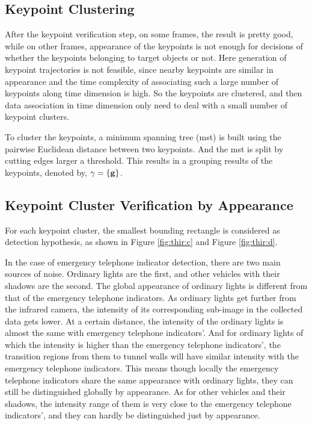 \subsection{Keypoint Clustering}
After the keypoint verification step, on some frames, the result is pretty good, while on other frames, appearance of the keypoints is not enough for decisions of whether the keypoints belonging to target objects or not. Here generation of keypoint trajectories is not feasible, since nearby keypoints are similar in appearance and  the time complexity of associating such a large number of keypoints along time dimension is high. So the keypoints are clustered, and then data association in time dimension only need to deal with a small number of keypoint clusters.

To cluster the keypoints, a minimum spanning tree (mst) is built using the pairwise Euclidean distance between two keypoints. And the mst is split by cutting edges larger a threshold. This results in a grouping results of the keypoints, denoted by, $\gamma=\{\bf{g}\}$.


\subsection{Keypoint Cluster Verification by Appearance}

For each keypoint cluster, the smallest bounding rectangle is considered as detection hypothesis, as shown in Figure \ref{fig:thir:c} and Figure \ref{fig:thir:d}.

In the case of emergency telephone indicator detection, there are two main sources of noise. Ordinary lights are the first, and other vehicles with their shadows are the second. The global appearance of ordinary lights is different from that of the emergency telephone indicators. As ordinary lights get further from the infrared camera, the intensity of its corresponding sub-image in the collected data gets lower. At a certain distance, the intensity of the ordinary  lights is almost the same with emergency telephone indicators'. And for ordinary lights of which the intensity is higher than the emergency telephone indicators', the transition regions from them to tunnel walls will have similar intensity with the emergency telephone indicators.
This means though locally the emergency telephone indicators share the same appearance with ordinary lights, they can still be distinguished globally by appearance. As for other vehicles and their shadows, the intensity range of them is very close to the emergency telephone indicators', and they can hardly be distinguished just by appearance.



